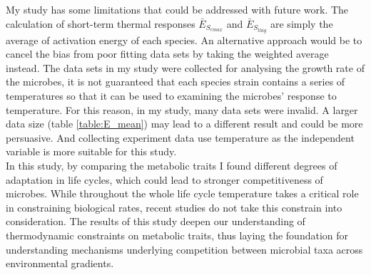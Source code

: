 \documentclass[a4paper]{article}
\begin{document}
My study has some limitations that could be addressed with future work. The calculation of short-term thermal responses $\bar{E}_{S_{rmax}}$ and $\bar{E}_{S_{tlag}}$ are simply the average of activation energy of each species. An alternative approach would be to cancel the bias from poor fitting data sets by taking the weighted average instead. The data sets in my study were collected for analysing the growth rate of the microbes, it is not guaranteed that each species strain contains a series of temperatures so that it can be used to examining the microbes' response to temperature. For this reason, in my study, many data sets were invalid. A larger data size (table \ref{table:E_mean}) may lead to a different result and could be more persuasive. And collecting experiment data use temperature as the independent variable is more suitable for this study.\\

In this study, by comparing the metabolic traits I found different degrees of adaptation in life cycles, which could lead to stronger competitiveness of microbes. While throughout the whole life cycle temperature takes a critical role in constraining biological rates, recent studies do not take this constrain into consideration. The results of this study deepen our understanding of thermodynamic constraints on metabolic traits, thus laying the foundation for understanding mechanisms underlying competition between microbial taxa across environmental gradients. \\



\end{document}
